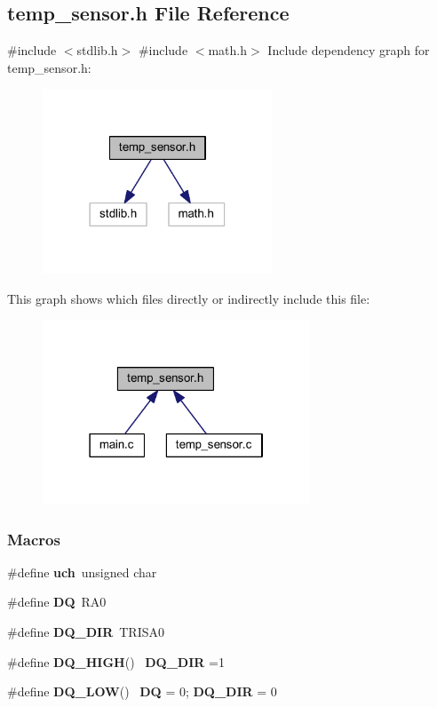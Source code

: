 \subsection{temp\+\_\+sensor.\+h File Reference}
\label{a00050}
{\ttfamily \#include $<$stdlib.\+h$>$}\newline
{\ttfamily \#include $<$math.\+h$>$}\newline
Include dependency graph for temp\+\_\+sensor.\+h\+:
\nopagebreak
\begin{figure}[H]
\begin{center}
\leavevmode
\includegraphics[width=194pt]{a00051}
\end{center}
\end{figure}
This graph shows which files directly or indirectly include this file\+:
\nopagebreak
\begin{figure}[H]
\begin{center}
\leavevmode
\includegraphics[width=226pt]{a00052}
\end{center}
\end{figure}
\subsubsection*{Macros}
\begin{DoxyCompactItemize}
\item 
\#define \textbf{ uch}~unsigned char
\item 
\#define \textbf{ DQ}~R\+A0
\item 
\#define \textbf{ D\+Q\+\_\+\+D\+IR}~T\+R\+I\+S\+A0
\item 
\#define \textbf{ D\+Q\+\_\+\+H\+I\+GH}()~\textbf{ D\+Q\+\_\+\+D\+IR} =1
\item 
\#define \textbf{ D\+Q\+\_\+\+L\+OW}()~\textbf{ DQ} = 0; \textbf{ D\+Q\+\_\+\+D\+IR} = 0
\end{DoxyCompactItemize}
